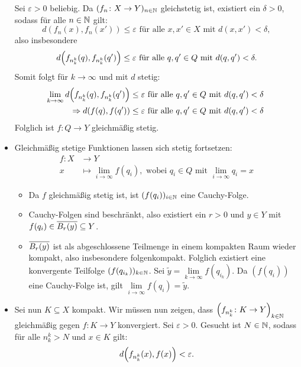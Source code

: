 \begin{beweis}
\begin{itemize}
		Sei $\varepsilon>0$ beliebig.
		Da $(f_n\colon X \rightarrow Y)_{n \in \NN}$ gleichstetig ist, existiert ein $\delta > 0$, sodass für alle $n \in \NN$ gilt:
		\[
			d(f_n(x),f_n(x')) \leq \varepsilon \text{ für alle } x,x' \in X \text{ mit } d(x,x') < \delta,
		\]
		also insbesondere
		\[
			d\enbrace*{f_{n_k^k}(q),f_{n_k^k}(q')} \leq \varepsilon \text{ für alle } q,q' \in Q \text{ mit } d(q,q') < \delta.
		\]
		Somit folgt für $k \rightarrow \infty$ und mit $d$ stetig:
		\begin{align*}
			\lim\limits_{k \rightarrow \infty} d\enbrace*{f_{n_k^k}(q),f_{n_k^k}(q')} &\leq \varepsilon \text{ für alle } q,q' \in Q \text{ mit } d(q,q') < \delta \\
			\Rightarrow d(f(q),f(q')) &\leq \varepsilon \text{ für alle } q,q' \in Q \text{ mit } d(q,q') < \delta \
		\end{align*}
		Folglich ist $f \colon Q \rightarrow Y$ gleichmäßig stetig.
		\newpage
		\item Gleichmäßig stetige Funktionen lassen sich stetig fortsetzen:
		\begin{align*}
			f \colon X &\longrightarrow Y \\
			x &\longmapsto \lim\limits_{i \rightarrow \infty} f(q_i), \text{ wobei } q_i \in Q \text{ mit } \lim\limits_{i \rightarrow \infty} q_i = x
		\end{align*}
		\begin{itemize}
			\item Da $f$ gleichmäßig stetig ist, ist $(f(q_i))_{i \in \NN}$ eine Cauchy-Folge.
			\item Cauchy-Folgen sind beschränkt, also existiert ein $r > 0$ und $y \in Y$ mit $f(q_i) \in \ol{B_r(y)} \subseteq Y$.
			\item $\ol{B_r(y)}$ ist als abgeschlossene Teilmenge in einem kompakten Raum wieder kompakt, also insbesondere folgenkompakt.
			Folglich existiert eine konvergente Teilfolge $(f(q_{i_k}))_{k \in \NN}$.
			Sei $\tilde{y} = \lim\limits_{k \rightarrow \infty} f(q_{i_k})$.
			Da $(f(q_i))$ eine Cauchy-Folge ist, gilt $\lim\limits_{i \rightarrow \infty} f(q_i) = \tilde{y}$.
		\end{itemize}
		\item Sei nun $K \subseteq X$ kompakt.
		Wir müssen nun zeigen, dass $\enbrace*{f_{n_k^k}\colon K \rightarrow Y}_{k \in \NN}$ gleichmäßig gegen $f \colon K \rightarrow Y$ konvergiert.
		Sei $\varepsilon > 0$.
		Gesucht ist $N \in \NN$, sodass für alle $n_k^k > N$ und $x \in K$ gilt:
		\[
			d\enbrace*{f_{n_k^k}(x),f(x)} < \varepsilon.
\]
\end{itemize}
\end{beweis}
